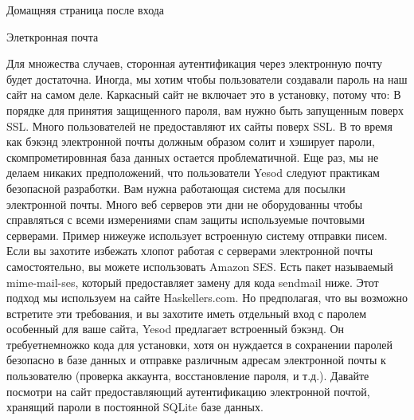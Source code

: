 Домащняя страница после входа 


Элеткронная почта

Для множества случаев, сторонная аутентификация через электронную почту будет достаточна. Иногда, мы хотим чтобы пользователи создавали пароль на наш сайт на самом деле. Каркасный сайт не включает это в установку, потому что:
В порядке для принятия защищенного пароля, вам нужно быть запущенным поверх SSL. Много пользователей не предоставляют их сайты поверх SSL.
В то время как бэкэнд электронной почты должным образом солит и хэширует пароли, скомпрометировнная база данных остается проблематичной. Еще раз, мы не делаем никаких предположений, что пользователи Yesod следуют практикам безопасной разработки.
Вам нужна работающая система для посылки электронной почты. Много веб серверов эти дни не оборудованны чтобы справляться с всеми измерениями спам защиты используемые почтовыми серверами.
Пример нижеуже использует встроенную систему отправки писем. Если вы захотите избежать хлопот работая с серверами электронной почты самостоятельно, вы можете использовать Amazon SES. Есть пакет называемый mime-mail-ses, который предоставляет замену для кода sendmail ниже. Этот подход мы используем на сайте Haskellers.com.
Но предполагая, что вы возможно встретите эти требования, и вы захотите иметь отдельный вход с паролем особенный для ваше сайта, Yesod предлагает встроенный бэкэнд. Он требуетнемножко кода для установки, хотя он нуждается в сохранении паролей безопасно в базе данных и отправке различным адресам электронной почты к пользователю (проверка аккаунта, восстановление пароля, и т.д.).
Давайте посмотри на сайт предоставляющий аутентификацию электронной почтой, хранящий пароли в постоянной SQLite базе данных.
